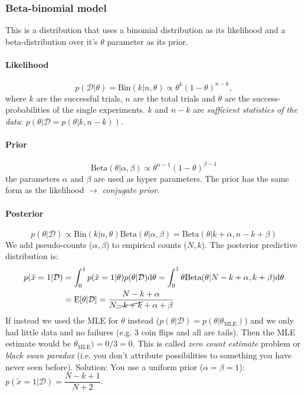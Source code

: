 \documentclass[../main.tex]{subfiles}
\begin{document}
    \subsubsection{Beta-binomial model} 
        This is a distribution that uses a binomial distribution as its likelihood and a beta-distribution over it's $\theta$ parameter as its prior. 

        \paragraph{Likelihood}
            $$p(\mathcal{D}|\theta) = \text{Bin}(k|n, \theta) \propto \theta^k (1-\theta)^{n-k},$$
        where $k$ are the successful trials, $n$ are the total trials and $\theta$ are the success-probabilities of the single experiments. $k$ and $n-k$ are \textit{sufficient statistics of the data}: $p(\theta|\mathcal{D} = p(\theta|k, n-k))$.

        \paragraph{Prior}
            $$\text{Beta}(\theta|\alpha, \beta) \propto \theta^{\alpha-1}(1-\theta)^{\beta-1}$$
            the parameters $\alpha$ and $\beta$ are used as hyper parameters. The prior has the same form as the likelihood $\rightarrow$ \textit{conjugate prior}. 

        \paragraph{Posterior}
            $$p(\theta|\mathcal{D}) \propto \text{Bin}(k|n,\theta)\text{Beta}(\theta|\alpha, \beta)=\text{Beta}(\theta|k+\alpha,n-k+\beta)$$
            \btw We add pseudo-counts ($\alpha, \beta$) to empirical counts ($N, k$).
            The posterior predictive distribution is:
            \begin{align*}
                p(\tilde{x}=1|\mathcal{D})& =\int_0^1 p(\tilde{x}=1|\theta)p(\theta|\mathcal{D})\mathrm{d}\theta 
                        =\int_0^1 \theta\text{Beta}(\theta|N-k+\alpha,k+\beta)\mathrm{d}\theta \\
                        & =\text{E}[\theta|\mathcal{D}]=\dfrac{N-k+\alpha}{N\cancel{-k+k}+\alpha+\beta} \\
            \end{align*}
            \attention If instead we used the MLE for $\theta$ instead ($p(\theta|\mathcal{D}) = p(\theta|\theta_{\text{MLE}})$) and we only had little data and no failures (e.g. 3 coin flips and all are tails). Then the MLE estimate would be $\theta_{\text{MLE}}) = 0/3 = 0$. This is called \textit{zero count estimate} problem or \textit{black swan paradox} (i.e. you don't attribute possibilities to something you have never seen before). Solution: You  use a uniform prior ($\alpha = \beta = 1$): $p(\tilde{x}=1|\mathcal{D}) = \dfrac{N-k+1}{N+2}$. %
\end{document}
